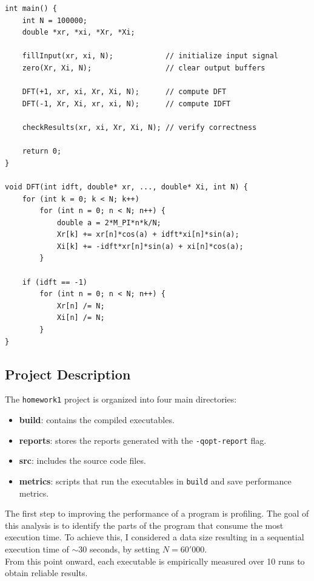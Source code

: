 \begin{lstlisting}[caption={Pseudo code in C}]
int main() {
    int N = 100000;
    double *xr, *xi, *Xr, *Xi;

    fillInput(xr, xi, N);            // initialize input signal
    zero(Xr, Xi, N);                 // clear output buffers

    DFT(+1, xr, xi, Xr, Xi, N);      // compute DFT
    DFT(-1, Xr, Xi, xr, xi, N);      // compute IDFT

    checkResults(xr, xi, Xr, Xi, N); // verify correctness

    return 0;
}

void DFT(int idft, double* xr, ..., double* Xi, int N) {
    for (int k = 0; k < N; k++)
        for (int n = 0; n < N; n++) {
            double a = 2*M_PI*n*k/N;
            Xr[k] += xr[n]*cos(a) + idft*xi[n]*sin(a);
            Xi[k] += -idft*xr[n]*sin(a) + xi[n]*cos(a);
        }

    if (idft == -1)
        for (int n = 0; n < N; n++) {
            Xr[n] /= N;
            Xi[n] /= N;
        }
}
\end{lstlisting}

\subsection{Project Description}
The \texttt{homework1} project is organized into four main directories:
\begin{itemize}
    \item \textbf{build}: contains the compiled executables.
    \item \textbf{reports}: stores the reports generated with the \texttt{-qopt-report} flag.
    \item \textbf{src}: includes the source code files.
    \item \textbf{metrics}: scripts that run the executables in \texttt{build} and save performance metrics.
\end{itemize}

\noindent
The first step to improving the performance of a program is profiling. The goal of this analysis is to identify the parts of the program that consume the most execution time. To achieve this, I considered a data size resulting in a sequential execution time of $\sim 30$ seconds, by setting $N = 60'000$.\\

\noindent
From this point onward, each executable is empirically measured over 10 runs to obtain reliable results.


